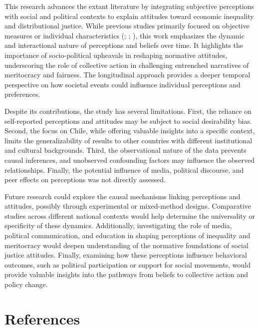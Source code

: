\documentclass[
  12pt,
]{article}
\begin{document}
This research advances the extant literature by integrating subjective
perceptions with social and political contexts to explain attitudes
toward economic inequality and distributional justice. While previous
studies primarily focused on objective measures or individual
characteristics (;
;
), this work emphasizes the
dynamic and interactional nature of perceptions and beliefs over time.
It highlights the importance of socio-political upheavals in reshaping
normative attitudes, underscoring the role of collective action in
challenging entrenched narratives of meritocracy and fairness. The
longitudinal approach provides a deeper temporal perspective on how
societal events could influence individual perceptions and preferences.

Despite its contributions, the study has several limitations. First, the
reliance on self-reported perceptions and attitudes may be subject to
social desirability bias. Second, the focus on Chile, while offering
valuable insights into a specific context, limits the generalizability
of results to other countries with different institutional and cultural
backgrounds. Third, the observational nature of the data prevents causal
inferences, and unobserved confounding factors may influence the
observed relationships. Finally, the potential influence of media,
political discourse, and peer effects on perceptions was not directly
assessed.

Future research could explore the causal mechanisms linking perceptions
and attitudes, possibly through experimental or mixed-method designs.
Comparative studies across different national contexts would help
determine the universality or specificity of these dynamics.
Additionally, investigating the role of media, political communication,
and education in shaping perceptions of inequality and meritocracy would
deepen understanding of the normative foundations of social justice
attitudes. Finally, examining how these perceptions influence behavioral
outcomes, such as political participation or support for social
movements, would provide valuable insights into the pathways from
beliefs to collective action and policy change.

\section{References}\label{references}
\end{document}
